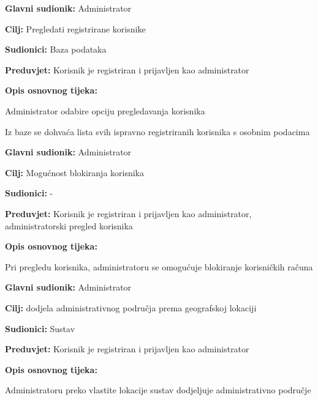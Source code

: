 \noindent {}
\begin{packed_item}
	
	\item \textbf{Glavni sudionik: }Administrator
	\item  \textbf{Cilj:} Pregledati registrirane korisnike
	\item  \textbf{Sudionici:} Baza podataka
	\item  \textbf{Preduvjet:} Korisnik je registriran i prijavljen kao administrator
	\item  \textbf{Opis osnovnog tijeka:}
	
	\item[] \begin{packed_enum}
		
		\item Administrator odabire opciju pregledavanja korisnika
		\item Iz baze se dohvaća lista svih ispravno registriranih korisnika s osobnim podacima
	\end{packed_enum}
\end{packed_item}
\newpage
\noindent {}
\begin{packed_item}
	\item \textbf{Glavni sudionik: }Administrator
	\item  \textbf{Cilj:} Mogućnost blokiranja korisnika
	\item  \textbf{Sudionici:} -
	\item  \textbf{Preduvjet:} Korisnik je registriran i prijavljen kao administrator, administratorski pregled korisnika
	\item  \textbf{Opis osnovnog tijeka:}
	
	\item[] \begin{packed_enum}
		
		\item Pri pregledu korisnika, administratoru se omogućuje blokiranje korisničkih računa
	\end{packed_enum}
\end{packed_item}

\noindent {}
\begin{packed_item}
	\item \textbf{Glavni sudionik: }Administrator
	\item  \textbf{Cilj:} dodjela administrativnog područja prema geografskoj lokaciji
	\item  \textbf{Sudionici:} Sustav
	\item  \textbf{Preduvjet:} Korisnik je registriran i prijavljen kao administrator
	\item  \textbf{Opis osnovnog tijeka:}
	\item[] \begin{packed_enum}
		\item Administratoru preko vlastite lokacije sustav dodjeljuje administrativno područje
	\end{packed_enum}
\end{packed_item}

